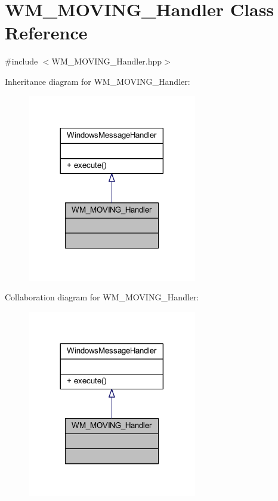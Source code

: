\hypertarget{class_w_m___m_o_v_i_n_g___handler}{}\section{W\+M\+\_\+\+M\+O\+V\+I\+N\+G\+\_\+\+Handler Class Reference}
\label{class_w_m___m_o_v_i_n_g___handler}


{\ttfamily \#include $<$W\+M\+\_\+\+M\+O\+V\+I\+N\+G\+\_\+\+Handler.\+hpp$>$}



Inheritance diagram for W\+M\+\_\+\+M\+O\+V\+I\+N\+G\+\_\+\+Handler\+:\nopagebreak
\begin{figure}[H]
\begin{center}
\leavevmode
\includegraphics[width=209pt]{class_w_m___m_o_v_i_n_g___handler__inherit__graph}
\end{center}
\end{figure}


Collaboration diagram for W\+M\+\_\+\+M\+O\+V\+I\+N\+G\+\_\+\+Handler\+:\nopagebreak
\begin{figure}[H]
\begin{center}
\leavevmode
\includegraphics[width=209pt]{class_w_m___m_o_v_i_n_g___handler__coll__graph}
\end{center}
\end{figure}
